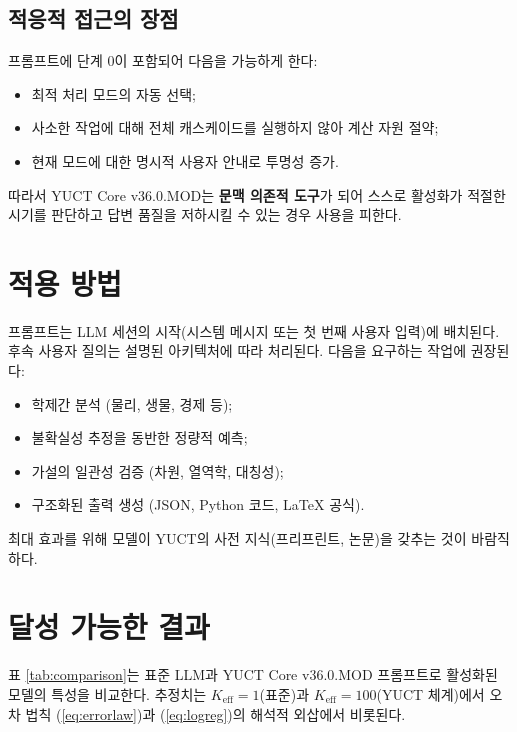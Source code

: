 \documentclass[11pt,a4paper]{article}
\begin{document}
	\subsection{적응적 접근의 장점}
	프롬프트에 단계 0이 포함되어 다음을 가능하게 한다:
	\begin{itemize}
		\item 최적 처리 모드의 자동 선택;
		\item 사소한 작업에 대해 전체 캐스케이드를 실행하지 않아 계산 자원 절약;
		\item 현재 모드에 대한 명시적 사용자 안내로 투명성 증가.
	\end{itemize}
	
	따라서 YUCT Core v36.0.MOD는 \textbf{문맥 의존적 도구}가 되어 스스로 활성화가 적절한 시기를 판단하고 답변 품질을 저하시킬 수 있는 경우 사용을 피한다.
	
	\section{적용 방법}
	프롬프트는 LLM 세션의 시작(시스템 메시지 또는 첫 번째 사용자 입력)에 배치된다. 후속 사용자 질의는 설명된 아키텍처에 따라 처리된다. 다음을 요구하는 작업에 권장된다:
	\begin{itemize}
		\item 학제간 분석 (물리, 생물, 경제 등);
		\item 불확실성 추정을 동반한 정량적 예측;
		\item 가설의 일관성 검증 (차원, 열역학, 대칭성);
		\item 구조화된 출력 생성 (JSON, Python 코드, LaTeX 공식).
	\end{itemize}
	최대 효과를 위해 모델이 YUCT의 사전 지식(프리프린트, 논문)을 갖추는 것이 바람직하다.
	
	\section{달성 가능한 결과}
	표 \ref{tab:comparison}는 표준 LLM과 YUCT Core v36.0.MOD 프롬프트로 활성화된 모델의 특성을 비교한다. 추정치는 $K_{\mathrm{eff}}=1$(표준)과 $K_{\mathrm{eff}}=100$(YUCT 체계)에서 오차 법칙 (\ref{eq:errorlaw})과 (\ref{eq:logreg})의 해석적 외삽에서 비롯된다.
	
\end{document}
